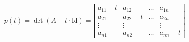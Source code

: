 \documentclass[a4paper, 11pt]{article}
\begin{document}
\[ p(t) = \det(A - t \cdot \text{Id}) = \left|
\begin{array}{cccc}
a_{11}-t & a_{12} & \ldots & a_{1n} \\
a_{21} & a_{22}-t & \ldots & a_{2n} \\
\vdots & \vdots &  & \vdots \\
a_{n1} & a_{n2} & \ldots & a_{nn}-t
\end{array}
\right| \]
\end{document}
